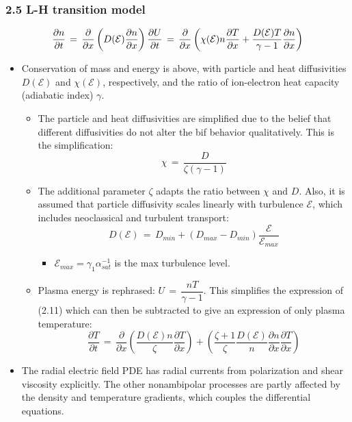 \documentclass[]{article}
\providecommand{\tightlist}{%
  \setlength{\itemsep}{0pt}\setlength{\parskip}{0pt}}
\begin{document}
\subsubsection{2.5 L-H transition model}\label{l-h-transition-model}

\[\frac{\partial n}{\partial t} \,=\, \frac{\partial}{\partial x} \left(D(\mathcal{E})\frac{\partial n}{\partial x}\right) \\ \frac{\partial U}{\partial t} \,=\, \frac{\partial}{\partial x}\left(\chi(\mathcal{E}) n \frac{\partial T}{\partial x} + \frac{D(\mathcal{E}) T}{\gamma - 1} \frac{\partial n}{\partial x}\right)\]

\begin{itemize}
\item
  Conservation of mass and energy is above, with particle and heat
  diffusivities \(D(\mathcal{E})\) and \(\chi(\mathcal{E})\),
  respectively, and the ratio of ion-electron heat capacity (adiabatic
  index) \(\gamma\).

  \begin{itemize}
  \item
    The particle and heat diffusivities are simplified due to the belief
    that different diffusivities do not alter the bif behavior
    qualitatively. This is the simplification:
    \[\chi \,=\, \frac{D}{\zeta(\gamma - 1)}\]
  \item
    The additional parameter \(\zeta\) adapts the ratio between \(\chi\)
    and \(D\). Also, it is assumed that particle diffusivity scales
    linearly with turbulence \(\mathcal{E}\), which includes
    neoclassical and turbulent transport:
    \[D(\mathcal{E}) \,=\, D_{min} + (D_{max} - D_{min}) \frac{\mathcal{E}}{\mathcal{E}_{max}}\]

    \begin{itemize}
    \tightlist
    \item
      \(\mathcal{E}_{max} = \gamma_1 \alpha_{sat}^{-1}\) is the max
      turbulence level.
    \end{itemize}
  \item
    Plasma energy is rephrased: \(U \,=\, \dfrac{n T}{\gamma - 1}\).
    This simplifies the expression of {(2.11)} which can then be
    subtracted to give an expression of only plasma temperature:
    \[\frac{\partial T}{\partial t} \,=\, \frac{\partial}{\partial x} \left(\frac{D(\mathcal{E}) n}{\zeta} \frac{\partial T}{\partial x}\right) + \left(\frac{\zeta + 1}{\zeta} \frac{D(\mathcal{E})}{n} \frac{\partial n}{\partial x} \frac{\partial T}{\partial x}\right)\]
  \end{itemize}
\item
  The radial electric field PDE has radial currents from polarization
  and shear viscosity explicitly. The other nonambipolar processes are
  partly affected by the density and temperature gradients, which
  couples the differential equations.


\end{itemize}
\end{document}
